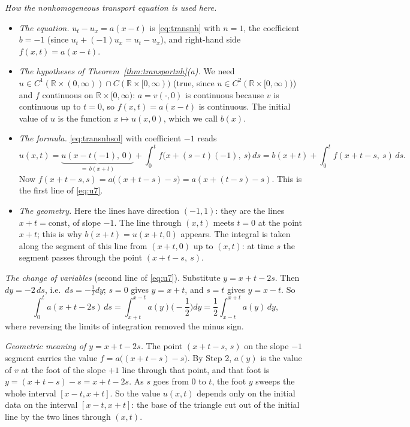\documentclass[11pt]{article}
\theoremstyle{plain}
\theoremstyle{definition}
\theoremstyle{remark}
\begin{document}
\emph{How the nonhomogeneous transport equation is used here.}
\begin{itemize}
    \item \emph{The equation.} $u_t - u_x = a(x - t)$ is \eqref{eq:transnh} with $n = 1$, the coefficient $b = -1$ (since $u_t + (-1)u_x = u_t - u_x$), and right-hand side $f(x,t) = a(x - t)$.
    \item \emph{The hypotheses of Theorem~\ref{thm:transportnh}(a).} We need $u \in C^1(\mathbb{R}\times(0,\infty)) \cap C(\mathbb{R}\times[0,\infty))$ (true, since $u \in C^2(\mathbb{R}\times[0,\infty))$) and $f$ continuous on $\mathbb{R}\times[0,\infty)$: $a = v(\cdot,0)$ is continuous because $v$ is continuous up to $t = 0$, so $f(x,t) = a(x - t)$ is continuous. The initial value of $u$ is the function $x \mapsto u(x,0)$, which we call $b(x)$.
    \item \emph{The formula.} \eqref{eq:transnhsol} with coefficient $-1$ reads
    $$ u(x,t) = \underbrace{u(x - t(-1),\, 0)}_{=\, b(x + t)} + \int_0^t f\big(x + (s - t)(-1),\ s\big)\, ds = b(x + t) + \int_0^t f(x + t - s,\ s)\, ds. $$
    Now $f(x + t - s, s) = a\big((x + t - s) - s\big) = a(x + (t - s) - s)$. This is the first line of \eqref{eq:u7}.
    \item \emph{The geometry.} Here the lines have direction $(-1,1)$: they are the lines $x + t = \text{const}$, of slope $-1$. The line through $(x,t)$ meets $t = 0$ at the point $x + t$; this is why $b(x + t) = u(x + t, 0)$ appears. The integral is taken along the segment of this line from $(x + t,0)$ up to $(x,t)$: at time $s$ the segment passes through the point $(x + t - s,\ s)$.
\end{itemize}

\emph{The change of variables} (second line of \eqref{eq:u7}). Substitute $y = x + t - 2s$. Then $dy = -2\,ds$, i.e.\ $ds = -\frac12 dy$; $s = 0$ gives $y = x + t$, and $s = t$ gives $y = x - t$. So
$$ \int_0^t a(x + t - 2s)\, ds = \int_{x+t}^{x-t} a(y)\Big(-\frac12\Big)dy = \frac12\int_{x-t}^{x+t} a(y)\, dy, $$
where reversing the limits of integration removed the minus sign.

\emph{Geometric meaning of $y = x + t - 2s$.} The point $(x + t - s,\, s)$ on the slope $-1$ segment carries the value $f = a\big((x + t - s) - s\big)$. By Step 2, $a(y)$ is the value of $v$ at the foot of the slope $+1$ line through that point, and that foot is $y = (x + t - s) - s = x + t - 2s$. As $s$ goes from $0$ to $t$, the foot $y$ sweeps the whole interval $[x - t, x + t]$. So the value $u(x,t)$ depends only on the initial data on the interval $[x - t, x + t]$: the base of the triangle cut out of the initial line by the two lines through $(x,t)$.
\end{document}
